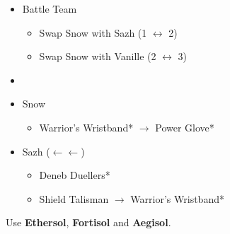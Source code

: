 \begin{menu}
	\begin{itemize}
		\paradigm
		\begin{itemize}
			\item Battle Team
				\begin{itemize}
					\item Swap Snow with Sazh (1 $\leftrightarrow$ 2)
					\item Swap Snow with Vanille (2 $\leftrightarrow$ 3)
				\end{itemize}
			\item {}%
				{\paradigmline{(\rav)}{(\com)}{\com}}%
				{\paradigmline[4]{\com}{\com}{\com}}%
				{\paradigmline{(\rav)}{(\rav)}{\sen}}%
				{\paradigmline{(\com)}{\med}{(\sen)}}%
				{\paradigmline{\rav}{(\rav)}{(\com)}}%
				{\paradigmline{\rav}{\rav}{\rav}}%
		\end{itemize}
		\equip
		\begin{itemize}
			\item Snow
				\begin{itemize}
					\item Warrior's Wristband* $\rightarrow$ Power Glove*
				\end{itemize}
			\item Sazh ($\leftarrow\leftarrow$)
				\begin{itemize}
					\item Deneb Duellers*
					\item Shield Talisman $\rightarrow$ Warrior's Wristband*
				\end{itemize}
		\end{itemize}
	\end{itemize}
\end{menu}

Use \textbf{Ethersol}, \textbf{Fortisol} and \textbf{Aegisol}.
\vfill
\renewcommand{\first}{[1] Aggression (\rav/\com/\com)}
\renewcommand{\second}{[2] Cerberus (\com/\com/\com)}
\renewcommand{\third}{[3] Mystic Tower (\rav/\rav/\sen)}
\renewcommand{\fourth}{[4] Solidarity (\com/\med/\sen)}
\renewcommand{\fifth}{[5] Relentless Assault (\rav/\rav/\com)}
\renewcommand{\sixth}{[6] Tri-Disaster (\rav/\rav/\rav)}


